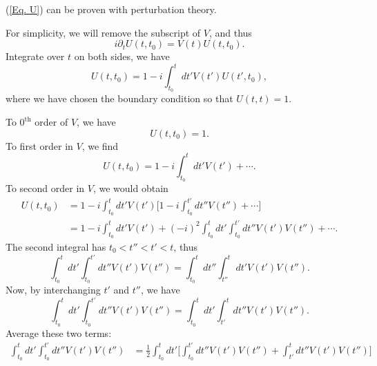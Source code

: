 \documentclass[11pt]{article}
\theoremstyle{definition}
\begin{document}
\begin{tcolorbox}[breakable, colback=yellow!20!white, colframe=black, boxrule=1pt]
    (\ref{Eq. U}) can be proven with perturbation theory.

    For simplicity, we will remove the subscript of $V$, and thus
    \begin{equation}
        i\partial_tU(t,t_0)  = V(t)U(t,t_0).
    \end{equation}
    Integrate over $t$ on both sides, we have
    \begin{equation}
        U(t, t_0) = 1 - i\int^t_{t_0} dt' V(t') U(t', t_0),
    \end{equation}
    where we have chosen the boundary condition so that $U(t, t)=1$.

    To $\text{0}^{\text{th}}$ order of $V$, we have
    \begin{equation}
        U(t, t_0) = 1.
    \end{equation}
    To first order in $V$, we find
    \begin{equation}
        U(t, t_0) = 1 - i\int^t_{t_0} dt' V(t') + \cdots.
    \end{equation}
    To second order in $V$, we would obtain
    \begin{equation}
    \begin{aligned}
                U(t, t_0) &= 1 - i\int^t_{t_0} dt' V(t') \biggr[ 1 - i\int^{t'}_{t_0} dt'' V(t'') + \cdots \biggr]\\
                &= 1 - i\int^t_{t_0} dt' V(t') + (-i)^2\int^t_{t_0} dt'\int^{t'}_{t_0} dt''V(t')V(t'') + \cdots.
    \end{aligned}
    \end{equation}
    The second integral has $t_0<t''<t'<t$, thus
    \begin{equation}
        \int^t_{t_0} dt'\int^{t'}_{t_0} dt''V(t')V(t'') = \int^t_{t_0} dt'' \int^{t}_{t''} dt' V(t')V(t'').
    \end{equation}
    Now, by interchanging $t'$ and $t''$, we have
    \begin{equation}
        \int^t_{t_0} dt'\int^{t'}_{t_0} dt''V(t')V(t'') = \int^t_{t_0} dt'\int^{t}_{t'} dt''V(t')V(t'').        
    \end{equation}
    Average these two terms:
    \begin{equation}
        \begin{aligned}
             \int^t_{t_0} dt'\int^{t'}_{t_0} dt''V(t')V(t'') &= \frac{1}{2}  \int^t_{t_0} dt'\biggr[\int^{t'}_{t_0} dt''V(t')V(t'') + \int^{t}_{t'} dt''V(t')V(t'')\biggr]\\

\end{aligned}
\end{equation}
\end{tcolorbox}
\end{document}
